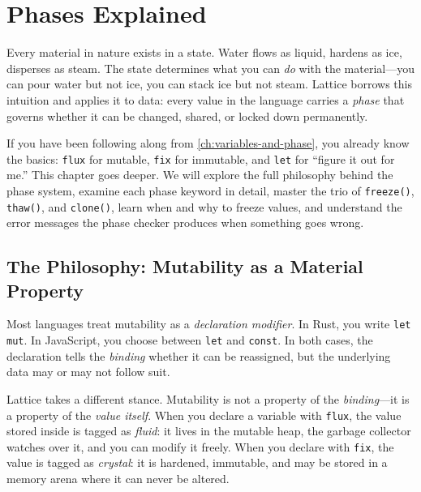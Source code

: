 \chapter{Phases Explained}\label{ch:phases-explained}


Every material in nature exists in a state.
Water flows as liquid, hardens as ice, disperses as steam.
The state determines what you can \emph{do} with the material---you can pour water but not ice, you can stack ice but not steam.
Lattice borrows this intuition and applies it to data: every value in the language carries a \emph{phase} that governs whether it can be changed, shared, or locked down permanently.

If you have been following along from \cref{ch:variables-and-phase}, you already know the basics: \lstinline|flux| for mutable, \lstinline|fix| for immutable, and \lstinline|let| for ``figure it out for me.''
This chapter goes deeper.
We will explore the full philosophy behind the phase system, examine each phase keyword in detail, master the trio of \lstinline|freeze()|, \lstinline|thaw()|, and \lstinline|clone()|, learn when and why to freeze values, and understand the error messages the phase checker produces when something goes wrong.

\section{The Philosophy: Mutability as a Material Property}\label{sec:mutability-as-material}


Most languages treat mutability as a \emph{declaration modifier}.
In Rust, you write \lstinline|let mut|.
In JavaScript, you choose between \lstinline|let| and \lstinline|const|.
In both cases, the declaration tells the \emph{binding} whether it can be reassigned, but the underlying data may or may not follow suit.

Lattice takes a different stance.
Mutability is not a property of the \emph{binding}---it is a property of the \emph{value itself}.
When you declare a variable with \lstinline|flux|, the value stored inside is tagged as \emph{fluid}: it lives in the mutable heap, the garbage collector watches over it, and you can modify it freely.
When you declare with \lstinline|fix|, the value is tagged as \emph{crystal}: it is hardened, immutable, and may be stored in a memory arena where it can never be altered.

